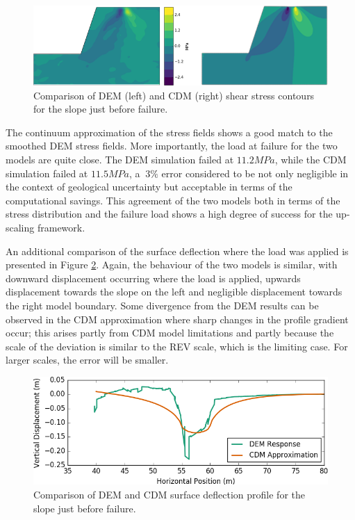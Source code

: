 \begin{figure}[!htb]
\begin{center}
\includegraphics[width=\textwidth]{figures/S12Contours/S12}
\caption{{\label{fig:S12DNS} Comparison of DEM (left) and CDM (right) shear stress contours for the slope just before failure.%
}}
\end{center}
\end{figure}

The continuum approximation of the stress fields shows a good match to the smoothed DEM stress fields. More importantly, the load at failure for the two models are quite close. The DEM simulation failed at $11.2 MPa$, while the CDM simulation failed at $11.5 MPa$, a $~3\%$ error considered to be not only negligible in the context of geological uncertainty but acceptable in terms of the computational savings. This agreement of the two models both in terms of the stress distribution and the failure load shows a high degree of success for the up-scaling framework. 

An additional comparison of the surface deflection where the load was applied is presented in Figure \ref{fig:surfacedeflection}. Again, the behaviour of the two models is similar, with downward displacement occurring where the load is applied, upwards displacement towards the slope on the left and negligible displacement towards the right model boundary. Some divergence from  the DEM results can be observed in the CDM approximation where sharp changes in the profile gradient occur; this arises partly from CDM model limitations and partly because the scale of the deviation is similar to the REV scale, which is the limiting case. For larger scales, the error will be smaller.

\begin{figure}[!htb]
\begin{center}
\includegraphics[width=\textwidth]{figures/SurfaceDeflection/SurfaceDeflection}
\caption{{\label{fig:surfacedeflection} Comparison of DEM and CDM surface deflection profile for the slope just before failure.%
}}
\end{center}
\end{figure}

